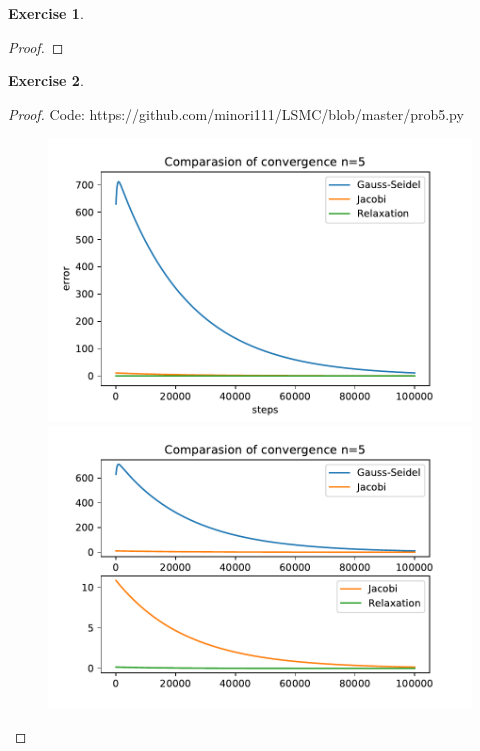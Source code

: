 \documentclass[11pt,a4paper]{article}
\renewcommand{\(}{\left(}
\renewcommand{\)}{\right)}
\newtheorem{exercise}{Exercise}
\begin{document}
  \begin{exercise}
  \end{exercise}  
  \begin{proof}
  	
  \end{proof}

  \begin{exercise}
  \end{exercise}  
  \begin{proof}
  	Code: https://github.com/minori111/LSMC/blob/master/prob5.py
  	
  	\begin{figure}
  		\centering
  		\includegraphics[]{n5-all}
  		\includegraphics[]{n5}  
    \end{figure}		
  	

\end{proof}
\end{document}
